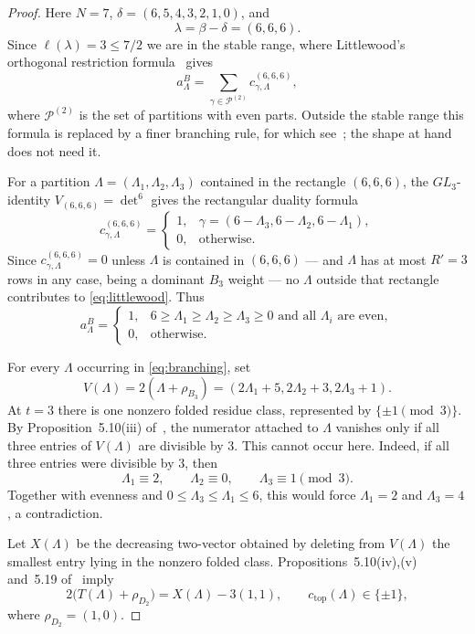 \documentclass[11pt]{amsart}
\theoremstyle{remark}
\newcommand{\ctop}{c_{\mathrm{top}}}
\newcommand{\Ptwo}{\mathcal P^{(2)}}
\begin{document}
\begin{proof}
Here $N=7$, $\delta=(6,5,4,3,2,1,0)$, and
\[
\lambda=\beta-\delta=(6,6,6).
\]
Since $\ell(\lambda)=3\le 7/2$ we are in the stable range, where
Littlewood's orthogonal restriction formula~\cite{KoikeTerada} gives
\begin{equation}\label{eq:littlewood}
a^B_\Lambda
=
\sum_{\gamma\in\Ptwo}
c^{(6,6,6)}_{\gamma,\Lambda},
\end{equation}
where $\Ptwo$ is the set of partitions with even parts. Outside the stable
range this formula is replaced by a finer branching rule, for which
see~\cite{JangKwon}; the shape at hand does not need it.

For a partition
$\Lambda=(\Lambda_1,\Lambda_2,\Lambda_3)$ contained in the rectangle
$(6,6,6)$, the $GL_3$-identity
$V_{(6,6,6)}=\det^6$ gives the rectangular duality formula
\[
c^{(6,6,6)}_{\gamma,\Lambda}
=
\begin{cases}
1,
&
\gamma=(6-\Lambda_3,6-\Lambda_2,6-\Lambda_1),
\\
0,
&
\text{otherwise}.
\end{cases}
\]
Since $c^{(6,6,6)}_{\gamma,\Lambda}=0$ unless $\Lambda$ is contained in
$(6,6,6)$ --- and $\Lambda$ has at most $R'=3$ rows in any case, being a
dominant $B_3$ weight --- no $\Lambda$ outside that rectangle contributes to
\eqref{eq:littlewood}. Thus
\begin{equation}\label{eq:branching}
a^B_\Lambda
=
\begin{cases}
1,
&
6\ge\Lambda_1\ge\Lambda_2\ge\Lambda_3\ge0
\text{ and all }\Lambda_i\text{ are even},
\\
0,
&
\text{otherwise}.
\end{cases}
\end{equation}

For every $\Lambda$ occurring in \eqref{eq:branching}, set
\[
V(\Lambda)
=
2(\Lambda+\rho_{B_3})
=
(2\Lambda_1+5,2\Lambda_2+3,2\Lambda_3+1).
\]
At $t=3$ there is one nonzero folded residue class, represented by
$\{\pm1\pmod3\}$. By Proposition~5.10(iii) of~\cite{Marin}, the
numerator attached to $\Lambda$ vanishes only if all three entries of
$V(\Lambda)$ are divisible by $3$. This cannot occur here. Indeed,
if all three entries were divisible by $3$, then
\[
\Lambda_1\equiv2,\qquad
\Lambda_2\equiv0,\qquad
\Lambda_3\equiv1
\pmod3.
\]
Together with evenness and
$0\le\Lambda_3\le\Lambda_1\le6$, this would force
$\Lambda_1=2$ and $\Lambda_3=4$, a contradiction.

Let $X(\Lambda)$ be the decreasing two-vector obtained by deleting
from $V(\Lambda)$ the smallest entry lying in the nonzero folded
class. Propositions~5.10(iv),(v) and~5.19 of~\cite{Marin} imply
\begin{equation}\label{eq:top}
2\bigl(T(\Lambda)+\rho_{D_2}\bigr)
=
X(\Lambda)-3(1,1),
\qquad
\ctop(\Lambda)\in\{\pm1\},
\end{equation}
where $\rho_{D_2}=(1,0)$.


\end{proof}
\end{document}
